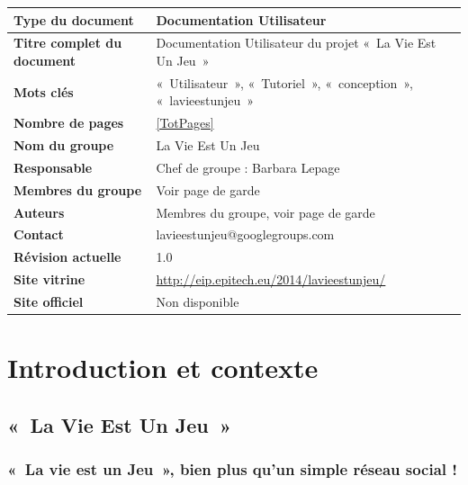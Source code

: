 \documentclass{life-fr}
\begin{document}
\begin{tabular}{ | m{5cm} | m{10cm} | }
	\hline
	\textbf{Type du document} & Documentation Utilisateur\\ %
	\hline
	\textbf{Titre complet du document} & Documentation Utilisateur du projet «~La Vie Est Un Jeu~»\\ %
	\hline
	\textbf{Mots clés} & «~Utilisateur~», «~Tutoriel~», «~conception~», «~lavieestunjeu~»\\ %
	\hline
	\textbf{Nombre de pages} & \ref{TotPages} \\
	\hline
	\textbf{Nom du groupe} & La Vie Est Un Jeu\\
	\hline
	\textbf{Responsable} & Chef de groupe : Barbara Lepage\\
	\hline
	\textbf{Membres du groupe} & Voir page de garde\\
	\hline
	\textbf{Auteurs} & Membres du groupe, voir page de garde\\
	\hline
	\textbf{Contact} & lavieestunjeu@googlegroups.com\\
	\hline
	\textbf{Révision actuelle} & 1.0\\ %
	\hline
	\textbf{Site vitrine} & \url{http://eip.epitech.eu/2014/lavieestunjeu/}\\
	\hline
	\textbf{Site officiel} & Non disponible\\
	\hline
\end{tabular}

\newpage

\tableofcontents


\chapter{Introduction et contexte}

\section{«~La Vie Est Un Jeu~»}

\subsection{«~La vie est un Jeu~», bien plus qu'un simple réseau social !}
\end{document}
